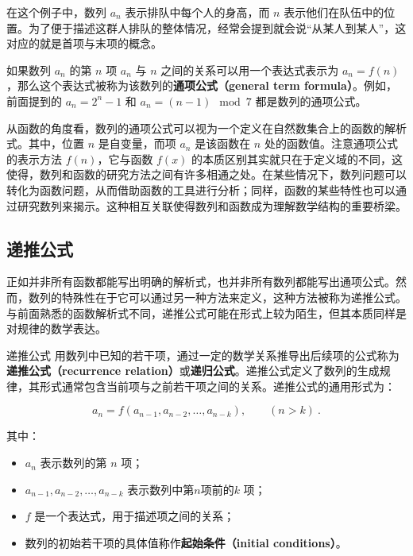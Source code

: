 在这个例子中，数列 ${a_n}$ 表示排队中每个人的身高，而 $n$ 表示他们在队伍中的位置。为了便于描述这群人排队的整体情况，经常会提到就会说“从某人到某人”，这对应的就是首项与末项的概念。

如果数列 ${a_n}$ 的第 $n$ 项 $a_n$ 与 $n$ 之间的关系可以用一个表达式表示为 $a_n = f(n)$，那么这个表达式被称为该数列的\textbf{通项公式（general term formula）}。例如，前面提到的 $a_n = 2^n - 1$ 和 $a_n = (n-1) \mod 7$ 都是数列的通项公式。

从函数的角度看，数列的通项公式可以视为一个定义在自然数集合上的函数的解析式。其中，位置 $n$ 是自变量，而项 $a_n$ 是该函数在 $n$ 处的函数值。注意通项公式的表示方法 $f(n)$，它与函数 $f(x)$ 的本质区别其实就只在于定义域的不同，这使得，数列和函数的研究方法之间有许多相通之处。在某些情况下，数列问题可以转化为函数问题，从而借助函数的工具进行分析；同样，函数的某些特性也可以通过研究数列来揭示。这种相互关联使得数列和函数成为理解数学结构的重要桥梁。

\subsection{递推公式}

正如并非所有函数都能写出明确的解析式，也并非所有数列都能写出通项公式。然而，数列的特殊性在于它可以通过另一种方法来定义，这种方法被称为递推公式。与前面熟悉的函数解析式不同，递推公式可能在形式上较为陌生，但其本质同样是对规律的数学表达。

\begin{definition}{递推公式}
用数列中已知的若干项，通过一定的数学关系推导出后续项的公式称为\textbf{递推公式（recurrence relation）}或\textbf{递归公式}。递推公式定义了数列的生成规律，其形式通常包含当前项与之前若干项之间的关系。递推公式的通用形式为：

\begin{equation}
a_n = f(a_{n-1}, a_{n-2}, \dots, a_{n-k}),\qquad(n>k)~.
\end{equation}

其中：
\begin{itemize}
\item $a_n$ 表示数列的第 $n$ 项；
\item $a_{n-1}, a_{n-2}, \dots, a_{n-k}$ 表示数列中第$n$项前的$k$ 项；
\item $f$ 是一个表达式，用于描述项之间的关系；
\item 数列的初始若干项的具体值称作\textbf{起始条件（initial conditions）}。
\end{itemize}
\end{definition}

